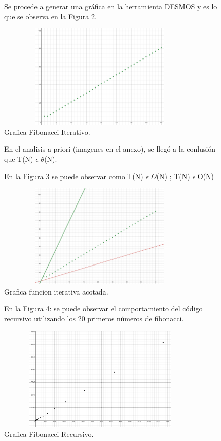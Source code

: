 \documentclass{report}
\begin{document}
	\begin{figure}
		\large Se procede a generar una gráfica en la herramienta DESMOS y es lo que se observa en la Figura 2.\par
		\centering
			\includegraphics[width=10cm, height=5cm]{2} \par
		\caption{Grafica Fibonacci Iterativo.}
	\end{figure}
	
	\begin{figure}[h]
		\large En el analisis a priori (imagenes en el anexo), se llegó a la conlusión que T(N) $\epsilon$  $\theta$(N).\par 
		\large En la Figura 3 se puede observar como T(N) $\epsilon$  $\Omega$(N) ; T(N) $\epsilon$  O(N) \par
		\centering
			\includegraphics[width=10cm, height=5cm]{3} \par
		\caption{Grafica funcion iterativa acotada.}
	\end{figure}
		
	\begin{figure}[h]
		\large En la Figura 4: se puede observar el comportamiento del código recursivo utilizando los 20 primeros números de fibonacci.\par
		\centering
			\includegraphics[width=10cm, height=5cm]{4} \par
		\caption{Grafica Fibonacci Recursivo.}
	\end{figure}
	\newpage
		
\end{document}
